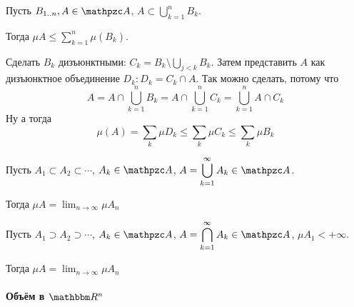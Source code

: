 \documentclass[12pt, timbord]{longnotes}
\begin{document}
\begin{prop}\label{prop:meas::meas::semiadd}
  Пусть $B_{1 \intrng n}, A \in \alg$, $A \subset \displaystyle \bigcup_{k=1}^n B_k$. \par
  Тогда $\displaystyle\mu A \leqslant \sum_{k=1}^n \mu(B_k)$.
\end{prop}
\begin{lproof}
  Сделать $B_k$ дизъюнктными: $C_k = B_k \setminus \bigcup_{j <k} B_k$. Затем представить $A$ как
  дизъюнктное объединение $D_k \colon D_k = C_k \cap A$. Так можно сделать, потому что
  \[
    A = A \cap \bigcup_{k=1}^n B_k = A \cap \bigcup_{k=1}^n C_k = \bigcup_{k=1}^n A \cap C_k
  \]
  Ну а тогда
  \[
    \mu (A) = \sum_k \mu D_k \leqslant \sum_k \mu C_k \leqslant \sum_k \mu B_k
  \]
\end{lproof}


\begin{prop}\label{prop:meas::meas::bcont}
  Пусть $A_1 \subset A_2 \subset \cdots$, $A_k \in \alg$,
  $\displaystyle A = \bigcup_{k=1}^\infty A_k \in \alg$.
   \par
  Тогда $\displaystyle \mu A = \lim_{n\to \infty} \mu A_n$
\end{prop}
\begin{prop}\label{prop:meas::meas::ucont}
  Пусть $A_1 \supset A_2 \supset \cdots$, $A_k \in \alg$, 
  $\displaystyle A = \bigcap_{k=1}^\infty A_k \in \alg$, $\mu A_1 < +\infty $.
  \par
  Тогда $\displaystyle \mu A = \lim_{n\to \infty} \mu A_n$
\end{prop}



\paragraph{Объём в \texorpdfstring{$\R^n$}{}}
\label{par:meas::vol}
\end{document}
